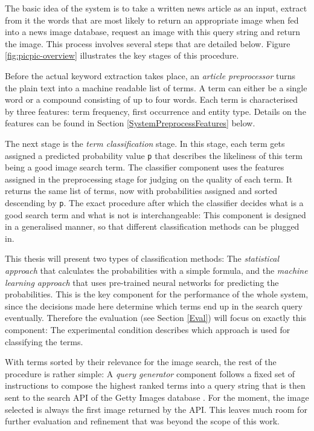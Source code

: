 \documentclass[11pt,a4paper,twoside]{article}
\begin{document}
The basic idea of the system is to take a written news article as an input, extract from it the words that are most likely to return an appropriate image when fed into a news image database, request an image with this query string and return the image. This process involves several steps that are detailed below. Figure \ref{fig:picpic-overview} illustrates the key stages of this procedure.

Before the actual keyword extraction takes place, an \emph{article preprocessor} turns the plain text into a machine readable list of terms. A term can either be a single word or a compound consisting of up to four words. Each term is characterised by three features: term frequency, first occurrence and entity type. Details on the features can be found in Section \ref{SystemPreprocessFeatures} below.

The next stage is the \emph{term classification} stage. In this stage, each term gets assigned a predicted probability value \lstinline|p| that describes the likeliness of this term being a good image search term. The classifier component uses the features assigned in the preprocessing stage for judging on the quality of each term. It returns the same list of terms, now with probabilities assigned and sorted descending by \lstinline{p}. The exact procedure after which the classifier decides what is a good search term and what is not is interchangeable: This component is designed in a generalised manner, so that different classification methods can be plugged in.

This thesis will present two types of classification methods: The \emph{statistical approach} that calculates the probabilities with a simple formula, and the \emph{machine learning approach} that uses pre-trained neural networks for predicting the probabilities. This is the key component for the performance of the whole system, since the decisions made here determine which terms end up in the search query eventually. Therefore the evaluation (see Section \ref{Eval}) will focus on exactly this component: The experimental condition describes which approach is used for classifying the terms.

With terms sorted by their relevance for the image search, the rest of the procedure is rather simple: A \emph{query generator} component follows a fixed set of instructions to compose the highest ranked terms into a query string that is then sent to the search API of the Getty Images database \cite{GettyImagesAPIOverview}. For the moment, the image selected is always the first image returned by the API. This leaves much room for further evaluation and refinement that was beyond the scope of this work.
\end{document}
